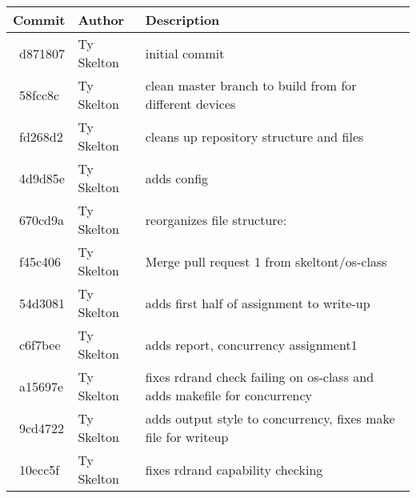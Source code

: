 \begin{tabular}{l l l}\textbf{Commit} & \textbf{Author} & \textbf{Description}\\\hline
\ d871807 & Ty Skelton & initial commit\\\hline
\ 58fcc8c & Ty Skelton & clean master branch to build from for different devices\\\hline
\ fd268d2 & Ty Skelton & cleans up repository structure and files\\\hline
\ 4d9d85e & Ty Skelton & adds config\\\hline
\ 670cd9a & Ty Skelton & reorganizes file structure:\\\hline
\ f45c406 & Ty Skelton & Merge pull request 1 from skeltont/os-class\\\hline
\ 54d3081 & Ty Skelton & adds first half of assignment to write-up\\\hline
\ c6f7bee & Ty Skelton & adds report, concurrency assignment1\\\hline
\ a15697e & Ty Skelton & fixes rdrand check failing on os-class and adds makefile for concurrency\\\hline
\ 9cd4722 & Ty Skelton & adds output style to concurrency, fixes make file for writeup\\\hline
\ 10ecc5f & Ty Skelton & fixes rdrand capability checking\\\hline\end{tabular}
